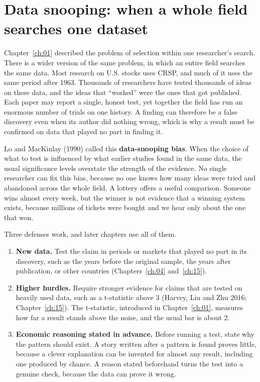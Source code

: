 \section{Data snooping: when a whole field searches one dataset}
\label{sec:02-snooping}

Chapter~\ref{ch:01} described the problem of selection within one researcher's search. There is a wider version of the same problem, in which an entire field searches the same data. Most research on U.S. stocks uses CRSP, and much of it uses the same period after 1963. Thousands of researchers have tested thousands of ideas on these data, and the ideas that ``worked'' were the ones that got published. Each paper may report a single, honest test, yet together the field has run an enormous number of trials on one history. A finding can therefore be a false discovery even when its author did nothing wrong, which is why a result must be confirmed on data that played no part in finding it.

Lo and MacKinlay (1990) called this \textbf{data-snooping bias}. When the choice of what to test is influenced by what earlier studies found in the same data, the usual significance levels overstate the strength of the evidence. No single researcher can fix this bias, because no one knows how many ideas were tried and abandoned across the whole field. A lottery offers a useful comparison. Someone wins almost every week, but the winner is not evidence that a winning system exists, because millions of tickets were bought and we hear only about the one that won.

Three defenses work, and later chapters use all of them.

\begin{enumerate}
  \item \textbf{New data.} Test the claim in periods or markets that played no part in its discovery, such as the years before the original sample, the years after publication, or other countries (Chapters~\ref{ch:04} and~\ref{ch:15}).
  \item \textbf{Higher hurdles.} Require stronger evidence for claims that are tested on heavily used data, such as a t-statistic above 3 (Harvey, Liu and Zhu 2016; Chapter~\ref{ch:15}). The t-statistic, introduced in Chapter~\ref{ch:01}, measures how far a result stands above the noise, and the usual bar is about 2.
    \item \textbf{Economic reasoning stated in advance.} Before running a test, state why the pattern should exist. A story written after a pattern is found proves little, because a clever explanation can be invented for almost any result, including one produced by chance. A reason stated beforehand turns the test into a genuine check, because the data can prove it wrong.
\end{enumerate}

